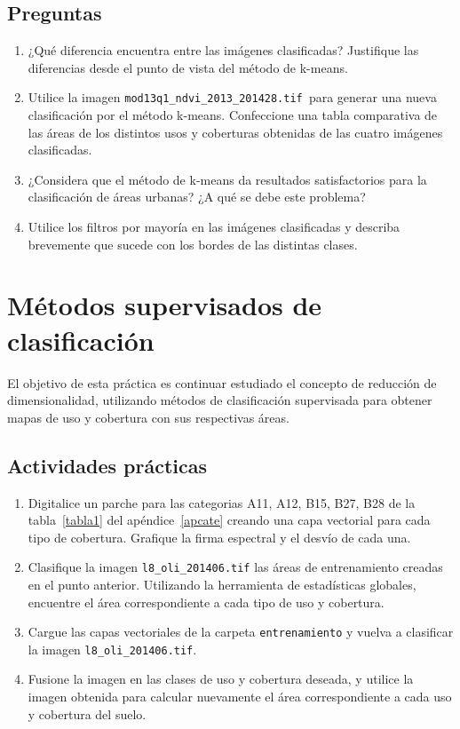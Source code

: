 \documentclass[hidelinks,12pt]{article}
\begin{document}
\subsection{Preguntas}
\begin{enumerate}
    \item ¿Qué diferencia encuentra entre las imágenes clasificadas? Justifique
        las diferencias desde el punto de vista del método de k-means.
    \item Utilice la imagen  \texttt{mod13q1\_ndvi\_2013\_2014\-28.tif }para 
        generar una nueva clasificación por el método k-means. Confeccione una 
        tabla comparativa de las áreas de los distintos usos y coberturas 
        obtenidas de las cuatro im\'agenes clasificadas.
    \item ¿Considera que el método de k-means da resultados satisfactorios para
        la clasificación de áreas urbanas? ¿A qué se debe este problema?
    \item Utilice los filtros por mayoría en las imágenes clasificadas y
        describa brevemente que sucede con los bordes de las distintas clases.
\end{enumerate}

\newpage
\section{Métodos supervisados de clasificación}
El objetivo de esta práctica es continuar estudiado el concepto de reducción de 
dimensionalidad, utilizando métodos de clasificación supervisada para obtener 
mapas de uso y cobertura con sus respectivas áreas. 

\subsection{Actividades pr\'acticas}
\begin{enumerate}
    \item Digitalice un parche  para las categorias A11, A12, B15, B27, B28 de la 
    tabla~\ref{tabla1} del ap\'endice~\ref{apcate} creando una capa vectorial para 
    cada tipo de cobertura. Grafique la firma espectral y el desvío de cada una. 
    \item Clasifique la imagen \texttt{l8\_oli\_2014\-06.tif} las
    áreas de entrenamiento creadas en el punto anterior. Utilizando la herramienta
    de estadísticas globales, encuentre el área correspondiente a cada tipo de uso y
    cobertura.
    \item Cargue las capas vectoriales de la carpeta \texttt{entrenamiento} y
        vuelva a clasificar la imagen \texttt{l8\_oli\_2014\-06.tif}.
    \item Fusione la imagen en las clases de uso y cobertura deseada, y utilice la
    imagen obtenida para calcular nuevamente el área correspondiente a cada uso y
    cobertura del suelo. 
\end{enumerate}
\end{document}
